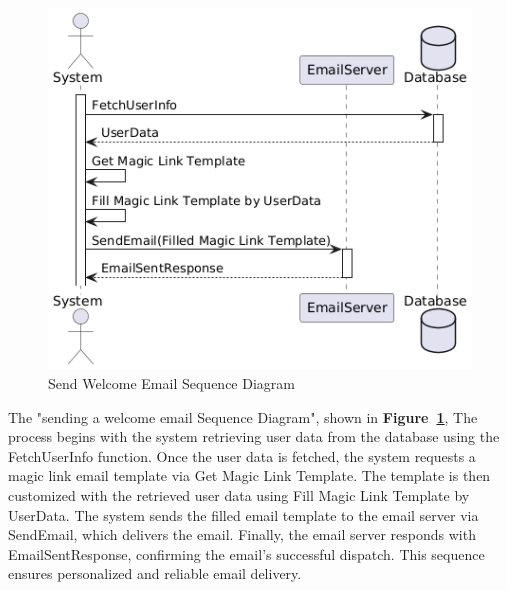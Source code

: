 \begin{figure}[!h]
  \centering
  \includegraphics[width=\textwidth]{images/docs/diagrams/sequence-diagrams/all-sequence-diagrams/Send Welcome Email.png}
  \caption{Send Welcome Email Sequence Diagram}
  \label{fig:seq/send-welcome-email}
\end{figure}
The "sending a welcome email Sequence Diagram", shown in \textbf{Figure~\ref{fig:seq/send-welcome-email}}, The process begins with the system retrieving user data from the database using the FetchUserInfo function. Once the user data is fetched, the system requests a magic link email template via Get Magic Link Template. The template is then customized with the retrieved user data using Fill Magic Link Template by UserData. The system sends the filled email template to the email server via SendEmail, which delivers the email. Finally, the email server responds with EmailSentResponse, confirming the email's successful dispatch. This sequence ensures personalized and reliable email delivery.
